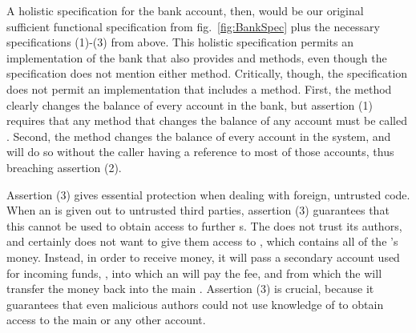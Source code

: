 \vspace{.1cm}

A  holistic  specification for the bank account, then,
would be our original sufficient functional specification from
fig.~\ref{fig:BankSpec} plus the necessary
specifications (1)-(3) from above. %
This holistic specification
permits an implementation of the bank that also provides  
and  methods, even though the specification does not mention either method.
Critically, though, the \Chainmail specification
does not permit an
implementation that includes a  method.
First, the  method clearly changes the balance of
every account in the bank, but assertion (1) requires that any method
that changes the balance of any account must be called .
Second, the  method changes the balance of every account in
the system, and will do so without the caller having a reference to
most of those accounts, thus breaching assertion (2).   
 
Assertion (3) gives essential protection when dealing with foreign, untrusted code.
When an  is given out to untrusted third parties, assertion (3) guarantees that
this  cannot be used to obtain access to further  s. 
The  does not trust its authors, and certainly does not want
to give them access to , which contains all of
the 's money. Instead, in order to receive money, it will
pass a secondary account used for incoming funds, ,
into which an   will pay the fee, and from which the  will transfer the money
back into the main . Assertion (3) is crucial, because it guarantees that even 
malicious authors  could not use knowledge of   to obtain access to
the main  or any other account. %

